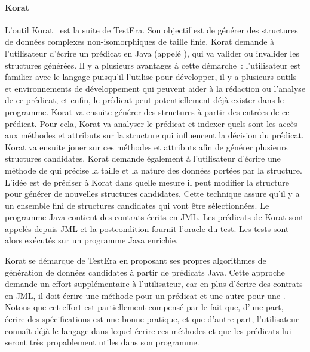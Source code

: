 \paragraph{Korat} L'outil Korat~ est la suite de TestEra.
Son objectif est de générer des structures de données complexes
non-isomorphiques de taille finie. Korat demande à l'utilisateur d'écrire un
prédicat en Java (appelé ), qui va valider ou invalider les
structures générées. Il y a plusieurs avantages à cette démarche~: l'utilisateur
est familier avec le langage puisqu'il l'utilise pour développer, il y a
plusieurs outils et environnements de développement qui peuvent aider à la
rédaction ou l'analyse de ce prédicat, et enfin, le prédicat peut
potentiellement déjà exister dans le programme. Korat va ensuite générer des
structures à partir des entrées de ce prédicat. Pour cela, Korat va analyser le
prédicat et indexer quels sont les accès aux méthodes et attributs sur la
structure qui influencent la décision du prédicat. Korat va ensuite jouer sur
ces méthodes et attributs afin de générer plusieurs structures candidates.
Korat demande également à l'utilisateur d'écrire une méthode de
 qui précise la taille et la nature des données portées
par la structure. L'idée est de préciser à Korat dans quelle mesure il peut
modifier la structure pour générer de nouvelles structures candidates. Cette
technique assure qu'il y a un ensemble fini de structures candidates qui vont
être sélectionnées. Le programme Java contient des contrats écrits en JML. Les
prédicats de Korat sont appelés depuis JML et la postcondition fournit l'oracle
du test. Les tests sont alors exécutés sur un programme Java enrichie.

Korat se démarque de TestEra en proposant ses propres algorithmes de génération
de données candidates à partir de prédicats Java. Cette approche demande un
effort supplémentaire à l'utilisateur, car en plus d'écrire des contrats en JML,
il doit écrire une méthode pour un prédicat et une autre pour une
. Notons que cet effort est partiellement compensé par
le fait que, d'une part, écrire des spécifications est une bonne pratique, et
que d'autre part, l'utilisateur connaît déjà le langage dans lequel écrire ces
méthodes et que les prédicats lui seront très propablement utiles dans son
programme.

